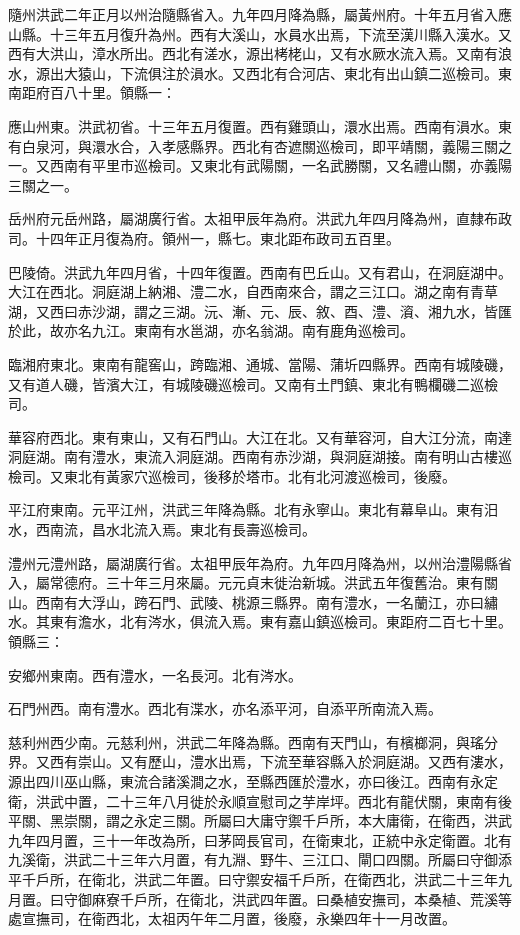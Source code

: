 隨州洪武二年正月以州治隨縣省入。九年四月降為縣，屬黃州府。十年五月省入應山縣。十三年五月復升為州。西有大溪山，水員水出焉，下流至漢川縣入漢水。又西有大洪山，漳水所出。西北有溠水，源出栲栳山，又有水厥水流入焉。又南有浪水，源出大猿山，下流俱注於溳水。又西北有合河店、東北有出山鎮二巡檢司。東南距府百八十里。領縣一：

應山州東。洪武初省。十三年五月復置。西有雞頭山，澴水出焉。西南有溳水。東有白泉河，與澴水合，入孝感縣界。西北有杏遮關巡檢司，即平靖關，義陽三關之一。又西南有平里市巡檢司。又東北有武陽關，一名武勝關，又名禮山關，亦義陽三關之一。

岳州府元岳州路，屬湖廣行省。太祖甲辰年為府。洪武九年四月降為州，直隸布政司。十四年正月復為府。領州一，縣七。東北距布政司五百里。

巴陵倚。洪武九年四月省，十四年復置。西南有巴丘山。又有君山，在洞庭湖中。大江在西北。洞庭湖上納湘、澧二水，自西南來合，謂之三江口。湖之南有青草湖，又西曰赤沙湖，謂之三湖。沅、漸、元、辰、敘、酉、澧、澬、湘九水，皆匯於此，故亦名九江。東南有水邕湖，亦名翁湖。南有鹿角巡檢司。

臨湘府東北。東南有龍窖山，跨臨湘、通城、當陽、蒲圻四縣界。西南有城陵磯，又有道人磯，皆濱大江，有城陵磯巡檢司。又南有土門鎮、東北有鴨欄磯二巡檢司。

華容府西北。東有東山，又有石門山。大江在北。又有華容河，自大江分流，南達洞庭湖。南有澧水，東流入洞庭湖。西南有赤沙湖，與洞庭湖接。南有明山古樓巡檢司。又東北有黃家穴巡檢司，後移於塔市。北有北河渡巡檢司，後廢。

平江府東南。元平江州，洪武三年降為縣。北有永寧山。東北有幕阜山。東有汨水，西南流，昌水北流入焉。東北有長壽巡檢司。

澧州元澧州路，屬湖廣行省。太祖甲辰年為府。九年四月降為州，以州治澧陽縣省入，屬常德府。三十年三月來屬。元元貞末徙治新城。洪武五年復舊治。東有關山。西南有大浮山，跨石門、武陵、桃源三縣界。南有澧水，一名蘭江，亦曰繡水。其東有澹水，北有涔水，俱流入焉。東有嘉山鎮巡檢司。東距府二百七十里。領縣三：

安鄉州東南。西有澧水，一名長河。北有涔水。

石門州西。南有澧水。西北有渫水，亦名添平河，自添平所南流入焉。

慈利州西少南。元慈利州，洪武二年降為縣。西南有天門山，有檳榔洞，與瑤分界。又西有崇山。又有歷山，澧水出焉，下流至華容縣入於洞庭湖。又西有漊水，源出四川巫山縣，東流合諸溪澗之水，至縣西匯於澧水，亦曰後江。西南有永定衛，洪武中置，二十三年八月徙於永順宣慰司之芋岸坪。西北有龍伏關，東南有後平關、黑崇關，謂之永定三關。所屬曰大庸守禦千戶所，本大庸衛，在衛西，洪武九年四月置，三十一年改為所，曰茅岡長官司，在衛東北，正統中永定衛置。北有九溪衛，洪武二十三年六月置，有九淵、野牛、三江口、閘口四關。所屬曰守御添平千戶所，在衛北，洪武二年置。曰守禦安福千戶所，在衛西北，洪武二十三年九月置。曰守御麻寮千戶所，在衛北，洪武四年置。曰桑植安撫司，本桑植、荒溪等處宣撫司，在衛西北，太祖丙午年二月置，後廢，永樂四年十一月改置。

